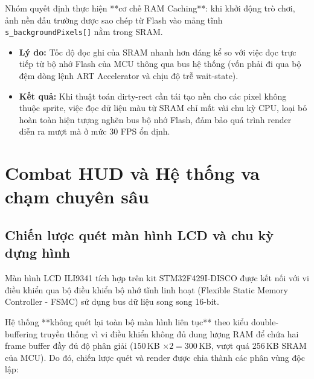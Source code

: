 \documentclass[a4paper,12pt]{report}
\begin{document}
Nhóm quyết định thực hiện **cơ chế RAM Caching**: khi khởi động trò chơi, ảnh nền đấu trường được sao chép từ Flash vào mảng tĩnh \texttt{s\_backgroundPixels[]} nằm trong SRAM. 
\begin{itemize}
    \item \textbf{Lý do:} Tốc độ đọc ghi của SRAM nhanh hơn đáng kể so với việc đọc trực tiếp từ bộ nhớ Flash của MCU thông qua bus hệ thống (vốn phải đi qua bộ đệm dòng lệnh ART Accelerator và chịu độ trễ wait-state).
    \item \textbf{Kết quả:} Khi thuật toán dirty-rect cần tái tạo nền cho các pixel không thuộc sprite, việc đọc dữ liệu màu từ SRAM chỉ mất vài chu kỳ CPU, loại bỏ hoàn toàn hiện tượng nghẽn bus bộ nhớ Flash, đảm bảo quá trình render diễn ra mượt mà ở mức 30 FPS ổn định.
\end{itemize}

\section{Combat HUD và Hệ thống va chạm chuyên sâu}
\label{sec:combat-hud}

\subsection{Chiến lược quét màn hình LCD và chu kỳ dựng hình}

Màn hình LCD ILI9341 tích hợp trên kit STM32F429I-DISCO được kết nối với vi điều khiển qua bộ điều khiển bộ nhớ tĩnh linh hoạt (Flexible Static Memory Controller - FSMC) sử dụng bus dữ liệu song song 16-bit. 

Hệ thống **không quét lại toàn bộ màn hình liên tục** theo kiểu double-buffering truyền thống vì vi điều khiển không đủ dung lượng RAM để chứa hai frame buffer đầy đủ độ phân giải ($150$\,KB $\times 2 = 300$\,KB, vượt quá 256\,KB SRAM của MCU). Do đó, chiến lược quét và render được chia thành các phân vùng độc lập:
\end{document}
